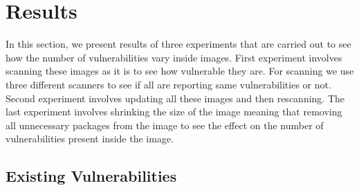 \documentclass[a4paper,num-refs]{oup-contemporary}
\begin{document}

\section{Results}

In this section, we present results of three experiments that are carried out to see
how the number of vulnerabilities vary inside images. First experiment involves scanning
these images as it is to see how vulnerable they are. For scanning we use three different scanners
to see if all are reporting same vulnerabilities or not. Second experiment involves updating
all these images and then rescanning. The last experiment involves shrinking the size of the image
meaning that removing all unnecessary packages from the image to see the effect on the number of
vulnerabilities present inside the image.

\subsection{Existing Vulnerabilities}
\end{document}
